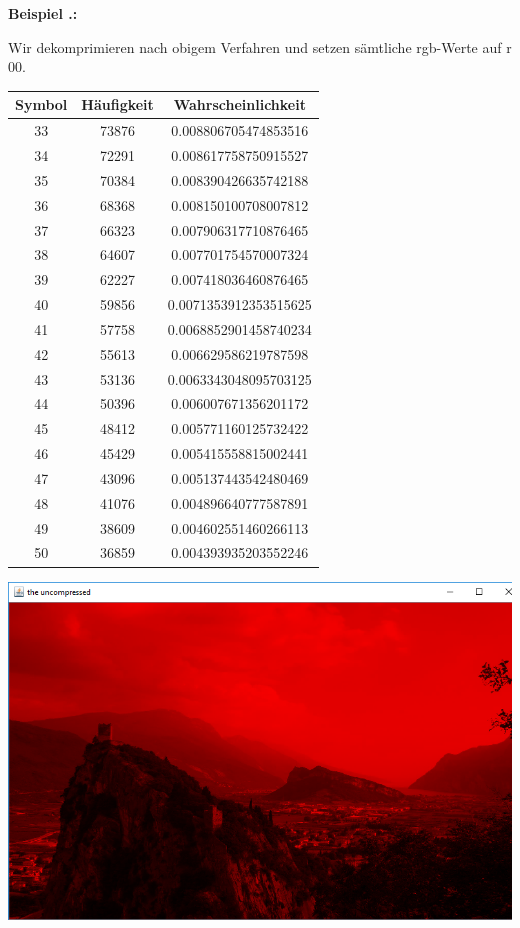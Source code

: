 \documentclass[a4paper,12pt]{article}
\newcounter{Beispiel}
\newenvironment{Beispiel}{
\medskip
        
        \setlength{\parindent}{0pt}
        \addtocounter{Beispiel}{1}
        \textbf{\textsf{Beispiel \thesubsection.\theBeispiel}:}\\}{
        \nopagebreak
        \vspace{-1.0ex}
        \bigskip
        
}
\begin{document}
\begin{Beispiel}
\begin{minipage}[h]{.4\textwidth}
\begin{flushright}
\hfill{}
\end{flushright}
\end{minipage}
\begin{minipage}[h]{.5\textwidth}
Wir dekomprimieren nach obigem Verfahren und setzen sämtliche rgb-Werte auf r$00$.
\begin{tabular}{c|c|c}
Symbol & Häufigkeit & Wahrscheinlichkeit
\\
\hline
33&	73876&	0.008806705474853516\\ \hline
34&	72291&	0.008617758750915527\\ \hline
35&	70384&	0.008390426635742188\\ \hline
36&	68368&	0.008150100708007812\\ \hline
37&	66323&	0.007906317710876465\\ \hline
38&	64607&	0.007701754570007324\\ \hline
39&	62227&	0.007418036460876465\\ \hline
40&	59856&	0.0071353912353515625\\ \hline
41&	57758&	0.0068852901458740234\\ \hline
42&	55613&	0.006629586219787598\\ \hline
43&	53136&	0.0063343048095703125\\ \hline
44&	50396&	0.006007671356201172\\ \hline
45&	48412&	0.005771160125732422\\ \hline
46&	45429&	0.005415558815002441\\ \hline
47&	43096&	0.005137443542480469\\ \hline
48&	41076&	0.004896640777587891\\ \hline
49&	38609&	0.004602551460266113\\ \hline
50&	36859&	0.004393935203552246\\ \hline
\end{tabular}
\end{minipage}
\hfill
\begin{minipage}[h]{.4\textwidth}
\begin{flushright}
\includegraphics[width=0.9\linewidth,height=0.5\textheight]{uncompressed}
\end{flushright}
\end{minipage}
\end{Beispiel}
\newpage
\end{document}
